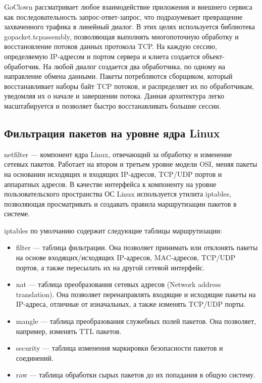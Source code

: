 GoClown рассматривает любое взаимодействие приложения и внешнего сервиса как
последовательность запрос-ответ-запрос, что подразумевает превращение
захваченного трафика в линейный диалог. В этих целях используется библиотека
gopacket.tcpassembly, позволяющая выполнять многопоточную обработку и
восстановление потоков данных протокола TCP. На каждую сессию, определяемую
IP-адресом и портом сервера и клиета создается объект-обработчик. На любой
диалог создается два обработчика, по одному на направление обмена данными.
Пакеты потребляются сборщиком, который восстанавливает наборы байт TCP потоков,
и распределяет их по обработчикам, уведомляя их о начале и завершении потока.
Данная архитектура легко масштабируется и позволяет быстро восстанавливать
большие сессии.

\subsection{Фильтрация пакетов на уровне ядра Linux}
netfilter --- компонент ядра Linux, отвечающий за обработку и изменение сетевых
пакетов. Работает на втором и третьем уровне модели OSI, меняя пакеты на
основании исходящих и входящих IP-адресов, TCP/UDP портов и аппаратных адресов.
В качестве интерфейса к компоненту на уровне пользовательского пространства
ОС Linux используется утилита iptables, позволяющая просматривать и создавать
правила маршрутизации пакетов в системе.

iptables по умолчанию содержит следующие таблицы маршрутизации:
\begin{itemize}
\item filter --- таблица фильтрации. Она позволяет принимать или отклонять
пакеты на основе входящих/исходящих IP-адресов, MAC-адресов, TCP/UDP портов, а
также пересылать их на другой сетевой интерфейс.  
\item nat --- таблица преобразования сетевых адресов (Network address
translation). Она позволяет перенаправлять входящие и исходящие пакеты на
IP-адреса, отличные от изначальных, а также изменять TCP/UDP порты.  
\item mangle --- таблица преобразования служебных полей пакетов. Она позволяет,
например, изменять TTL пакетов.  
\item security --- таблица изменения маркировки безопасности пакетов и
соединений.  
\item raw --- таблица обработки сырых пакетов до их попадания в общую систему.  
\end{itemize}

